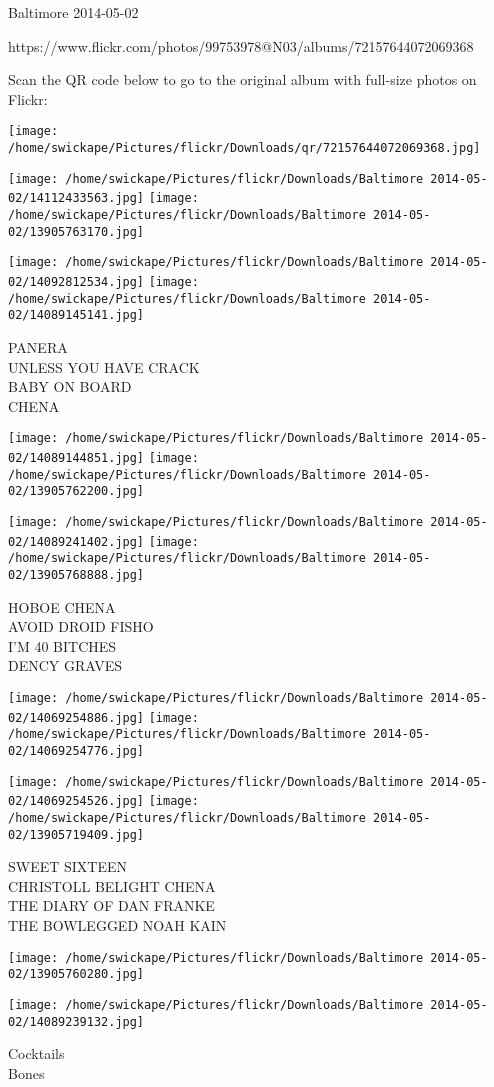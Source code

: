 \documentclass[10pt,letterpaper]{article}
\begin{document}
Baltimore 2014-05-02

https://www.flickr.com/photos/99753978@N03/albums/72157644072069368

Scan the QR code below to go to the original album with full-size photos on Flickr:

\texttt{[image: /home/swickape/Pictures/flickr/Downloads/qr/72157644072069368.jpg]}
\pagebreak

\texttt{[image: /home/swickape/Pictures/flickr/Downloads/Baltimore 2014-05-02/14112433563.jpg]}
\texttt{[image: /home/swickape/Pictures/flickr/Downloads/Baltimore 2014-05-02/13905763170.jpg]}

\texttt{[image: /home/swickape/Pictures/flickr/Downloads/Baltimore 2014-05-02/14092812534.jpg]}
\texttt{[image: /home/swickape/Pictures/flickr/Downloads/Baltimore 2014-05-02/14089145141.jpg]}

PANERA\\
UNLESS YOU HAVE CRACK\\
BABY ON BOARD\\
CHENA\\
\pagebreak

\texttt{[image: /home/swickape/Pictures/flickr/Downloads/Baltimore 2014-05-02/14089144851.jpg]}
\texttt{[image: /home/swickape/Pictures/flickr/Downloads/Baltimore 2014-05-02/13905762200.jpg]}

\texttt{[image: /home/swickape/Pictures/flickr/Downloads/Baltimore 2014-05-02/14089241402.jpg]}
\texttt{[image: /home/swickape/Pictures/flickr/Downloads/Baltimore 2014-05-02/13905768888.jpg]}

HOBOE CHENA\\
AVOID DROID FISHO\\
I'M 40 BITCHES\\
DENCY GRAVES\\
\pagebreak

\texttt{[image: /home/swickape/Pictures/flickr/Downloads/Baltimore 2014-05-02/14069254886.jpg]}
\texttt{[image: /home/swickape/Pictures/flickr/Downloads/Baltimore 2014-05-02/14069254776.jpg]}

\texttt{[image: /home/swickape/Pictures/flickr/Downloads/Baltimore 2014-05-02/14069254526.jpg]}
\texttt{[image: /home/swickape/Pictures/flickr/Downloads/Baltimore 2014-05-02/13905719409.jpg]}

SWEET SIXTEEN\\
CHRISTOLL BELIGHT CHENA\\
THE DIARY OF DAN FRANKE\\
THE BOWLEGGED NOAH KAIN\\
\pagebreak

\texttt{[image: /home/swickape/Pictures/flickr/Downloads/Baltimore 2014-05-02/13905760280.jpg]}

\vspace{0.25in}
\texttt{[image: /home/swickape/Pictures/flickr/Downloads/Baltimore 2014-05-02/14089239132.jpg]}

Cocktails\\
Bones\\
\pagebreak
\end{document}
